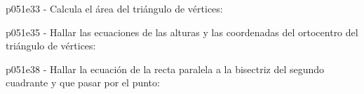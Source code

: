 \documentclass[spanish, 11pt]{exam}
\begin{document}
\begin{questions}
\begin{multicols}{1}
\begin{parts}
        \end{parts}
        \end{multicols}
        \question p051e33 - Calcula el área del triángulo de vértices:
        \begin{multicols}{1} 
        \end{multicols}
        \question p051e35 - Hallar las ecuaciones de las alturas y las coordenadas del ortocentro del triángulo de vértices:
        \begin{multicols}{1} 
        \end{multicols}
        \question p051e38 - Hallar la ecuación de la recta paralela a la bisectriz del segundo cuadrante y que pasar por el punto:
        \begin{multicols}{1} 
        \end{multicols}
        
    \end{questions}
    
\end{document}
